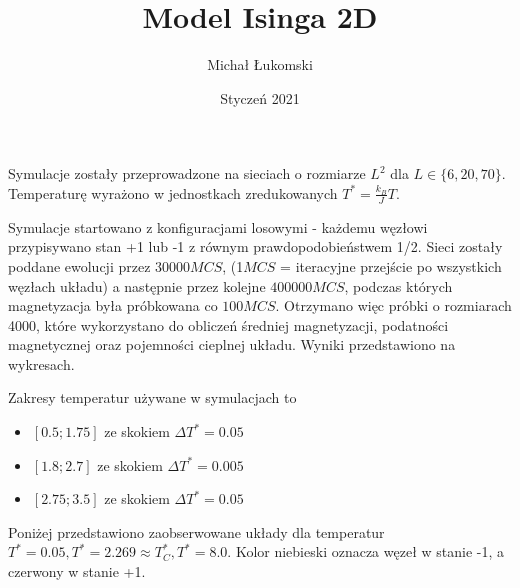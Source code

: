 \documentclass[11pt]{article}
\title{Model Isinga 2D}
\author{Michał Łukomski}
\date{Styczeń 2021}
\begin{document}
\maketitle

 Symulacje zostały przeprowadzone na sieciach o rozmiarze $L^2$ dla $L \in \{6,20,70\}$. Temperaturę wyrażono w jednostkach zredukowanych $T^* = \frac{k_B}{J} T$. %

Symulacje startowano z konfiguracjami losowymi - każdemu węzłowi przypisywano stan +1 lub -1 z równym prawdopodobieństwem 1/2. Sieci zostały poddane ewolucji przez $30 000 MCS$, (1$MCS$ = iteracyjne przejście po wszystkich węzłach układu) a następnie przez kolejne $400 000 MCS$, podczas których magnetyzacja była próbkowana co $100 MCS$. Otrzymano więc próbki o rozmiarach 4000, które wykorzystano do obliczeń średniej magnetyzacji, podatności magnetycznej oraz pojemności cieplnej układu. Wyniki przedstawiono na wykresach.

Zakresy temperatur używane w symulacjach to
\begin{itemize}
    \centering
    \item $[0.5; 1.75]$ ze skokiem $\Delta T^* = 0.05$
    \item $[1.8; 2.7]$  ze skokiem $\Delta T^* = 0.005$
    \item $[2.75; 3.5]$ ze skokiem $\Delta T^* = 0.05$
\end{itemize}


Poniżej przedstawiono zaobserwowane układy dla temperatur $T^* = 0.05, T^* = 2.269 \approx T^*_C, T^* = 8.0$. Kolor niebieski oznacza węzeł w stanie -1, a czerwony w stanie +1.
\end{document}
